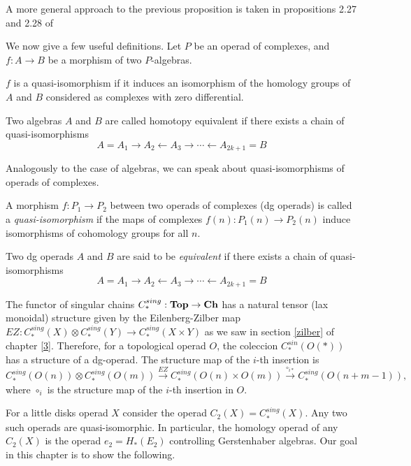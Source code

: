 \documentclass[TFM.tex]{subfiles}
\begin{document}
A more general approach to the previous proposition is taken in propositions 2.27 and 2.28 of \cite{tesis}

We now give a few useful definitions. Let $P$ be an operad of complexes, and $f : A→B$ be a morphism of two $P$-algebras.
\begin{defi}
$f$ is a quasi-isomorphism if it induces an isomorphism of the homology
groups of $A$ and $B$ considered as complexes with zero differential.
\end{defi}

\begin{defi}
Two algebras $A$ and $B$ are called homotopy equivalent if there exists a chain of quasi-isomorphisms
\[
A= A_1→A_2←A_3→\cdots←A_{2k+1} = B
\]
\end{defi}

Analogously to the case of algebras, we can speak about quasi-isomorphisms of operads
of complexes.

\begin{defi}
A morphism $f : P_1→P_2$ between two operads of complexes (dg operads) is called a
\emph{quasi-isomorphism} if the maps of complexes $f(n) : P_1(n)→P_2(n)$ induce isomorphisms of
cohomology groups for all $n$.
\end{defi}

\begin{defi}
Two dg operads $A$ and $B$ are said to be \emph{equivalent} if there exists a chain of quasi-isomorphisms
\[
A= A_1→A_2←A_3→\cdots←A_{2k+1} = B
\]
\end{defi}


The functor of singular chains $C_*^{sing}:\mathrm{\mathbf{Top}}\to \mathrm{\mathbf{Ch}}$ has a natural tensor (lax monoidal) structure given by the Eilenberg-Zilber map $EZ:C_*^{sing}(X)\otimes C_*^{sing}(Y)\to C_*^{sing}(X\times Y)$ as we saw in section \ref{zilber} of chapter \ref{3}. Therefore, for a topological operad $O$, the coleccion $C_*^{sin}(O(*))$ has a structure of a dg-operad. The structure map of the $i$-th insertion is 
\[
C_*^{sing}(O(n))\otimes C_*^{sing}(O(m))\xrightarrow{EZ} C_*^{sing}(O(n)\times O(m))\xrightarrow{\circ_{i*}} C_*^{sing}(O(n+m-1)),
\]
where $\circ_i$ is the structure map of the $i$-th insertion in $O$. 

For a little disks operad $X$ consider the operad $C_2(X)=C_*^{sing}(X)$. Any two such operads are quasi-isomorphic. In particular, the homology operad of any $C_2(X)$ is the operad $e_2=H_*(E_2)$ controlling Gerstenhaber algebras. Our goal in this chapter is to show the following.
\end{document}
